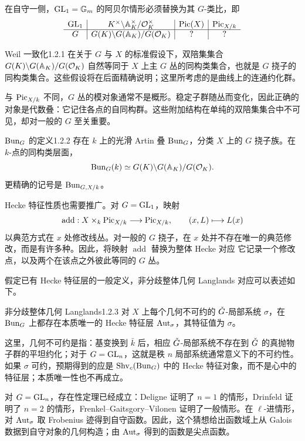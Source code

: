在自守一侧，$\operatorname{GL}_1=\mathbb{G}_{m}$ 的阿贝尔情形必须替换为其 $G$-类比，即
\[
\begin{array}{c|c|c|c}
\operatorname{GL}_1&K^\times\backslash\mathbb{A}_K^\times/\mathcal{O}_K^\times&\operatorname{Pic}(X)&\operatorname{Pic}_{X/k}\\\hline
G&G(K)\backslash G(\mathbb{A}_K)/G(\mathcal{O}_K)&?&?
\end{array}
\]
\begin{theorem}{Weil 一致化}{1.2.1}
在关于 $G$ 与 $X$ 的标准假设下，双陪集集合 $G(K)\backslash G(\mathbb{A}_K)/G(\mathcal{O}_K)$ 自然等同于 $X$ 上主 $G$ 丛的同构类集合，也就是 $G$ 挠子的同构类集合。这些假设将在后面精确说明；这里所考虑的是曲线上的连通约化群。
\end{theorem}

与 $\operatorname{Pic}_{X/k}$ 不同，$G$ 丛的模对象通常不是概形。稳定子群随丛而变化，因此正确的对象是代数叠：它记住各点的自同构群。这些附加结构在单纯的双陪集集合中不可见，却对一般的 $G$ 至关重要。

\begin{proposition}{$\operatorname{Bun}_G$ 的定义}{1.2.2}
存在 $k$ 上的光滑 Artin 叠 $\operatorname{Bun}_G$，分类 $X$ 上的 $G$ 挠子族。在 $k$-点的同构类层面，
\[\operatorname{Bun}_G(k)\simeq G(K)\backslash G(\mathbb{A}_K)/G(\mathcal{O}_K).\]
更精确的记号是 $\operatorname{Bun}_{G,X/k}$。
\end{proposition}

Hecke 特征性质也需要推广。对 $G=\operatorname{GL}_1$，映射
\[\operatorname{add}:X\times_k\operatorname{Pic}_{X/k}\longrightarrow\operatorname{Pic}_{X/k},\qquad(x,L)\longmapsto L(x)\]
以典范方式在 $x$ 处修改线丛。对一般的 $G$ 挠子，在 $x$ 处并不存在唯一的典范修改，而是有许多种。因此，将映射 $\operatorname{add}$ 替换为整体 Hecke 对应
它记录一个修改点，以及两个在该点之外彼此等同的 $G$ 丛。

假定已有 Hecke 特征层的一般定义，非分歧整体几何 Langlands 对应可以表述如下。
\begin{conjecture}{非分歧整体几何 Langlands}{1.2.3}
对 $X$ 上每个几何不可约的 $\check{G}$-局部系统 $\sigma$，在 $\operatorname{Bun}_G$ 上都存在本质唯一的 Hecke 特征层 $\operatorname{Aut}_\sigma$，其特征值为 $\sigma$。
\end{conjecture}

这里，几何不可约是指：基变换到 $\bar k$ 后，相应 $\check{G}$-局部系统不存在到 $\check{G}$ 的真抛物子群的平坦约化；对于 $G=\operatorname{GL}_n$，这就是秩 $n$ 局部系统通常意义下的不可约性。如果 $\sigma$ 可约，预期得到的应是 $\operatorname{Shv}_c(\operatorname{Bun}_G)$ 中的 Hecke 特征对象，而不是心中的特征层；本质唯一性也不再成立。

对 $G=\operatorname{GL}_n$，存在性定理已经成立：Deligne 证明了 $n=1$ 的情形，Drinfeld 证明了 $n=2$ 的情形，Frenkel–Gaitsgory–Vilonen 证明了一般情形\cite{FGKV98}。在 $\ell$-进情形，对 $\operatorname{Aut}_\sigma$ 取 Frobenius 迹得到自守函数。因此，这个猜想给出函数域上从 Galois 数据到自守对象的几何构造；由 $\operatorname{Aut}_\sigma$ 得到的函数是尖点函数。

